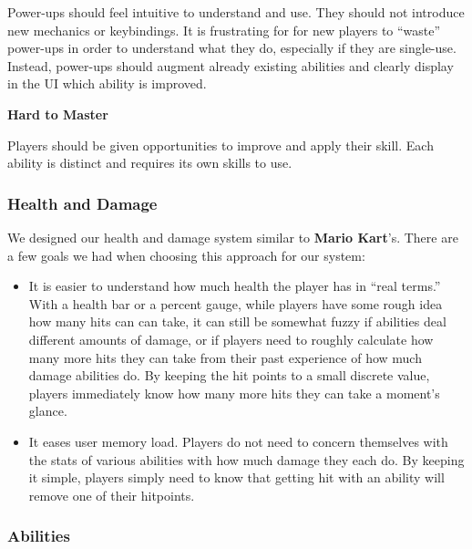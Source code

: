 \documentclass{article}
\theoremstyle{definition}
\begin{document}
Power-ups should feel intuitive to understand and use. They should not
introduce new mechanics or keybindings. It is frustrating for for new players
to ``waste'' power-ups in order to understand what they do, especially if they
are single-use. Instead, power-ups should augment already existing abilities
and clearly display in the UI which ability is improved.

\textbf{Hard to Master}

Players should be given opportunities to improve and apply their skill. Each
ability is distinct and requires its own skills to use.

\subsubsection{Health and Damage}

We designed our health and damage system similar to \textbf{Mario Kart}'s.
There are a few goals we had when choosing this approach for our system:
\begin{itemize}
  \item It is easier to understand how much health the player has in ``real
    terms.'' With a health bar or a percent gauge, while players have some
    rough idea how many hits can can take, it can still be somewhat fuzzy if
    abilities deal different amounts of damage, or if players need to roughly
    calculate how many more hits they can take from their past experience of
    how much damage abilities do. By keeping the hit points to a small discrete
    value, players immediately know how many more hits they can take a moment's
    glance.
  \item It eases user memory load. Players do not need to concern themselves
    with the stats of various abilities with how much damage they each do. By
    keeping it simple, players simply need to know that getting hit with an
    ability will remove one of their hitpoints.
\end{itemize}

\subsubsection{Abilities}
\end{document}
